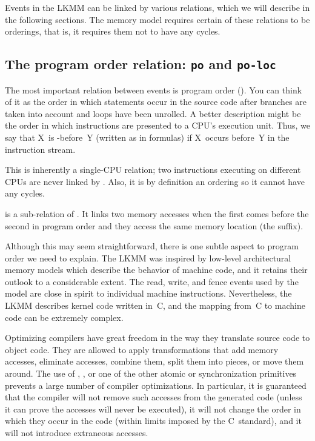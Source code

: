 Events in the LKMM can be linked by various relations, which we will
describe in the following sections.
The memory model requires certain of these relations to be orderings,
that is, it requires them not to have any cycles.


\subsection{The program order relation: \texttt{po} and \texttt{po-loc}}
\label{sec:docs:explanation:The Program Order Relation: po and po-loc}

The most important relation between events is program order ().
You can think of it as the order in which statements occur in the source
code after branches are taken into account and loops have been
unrolled.
A better description might be the order in which instructions are
presented to a CPU's execution unit.
Thus, we say that X~is -before~Y (written as  in
formulas) if X~occurs before~Y in the instruction stream.

This is inherently a single-CPU relation; two instructions executing
on different CPUs are never linked by .
Also, it is by definition an ordering so it cannot have any cycles.

 is a sub-relation of .
It links two memory accesses when the first comes before the second
in program order and they access the same memory location (the 
suffix).

Although this may seem straightforward, there is one subtle aspect to
program order we need to explain.
The LKMM was inspired by low-level architectural memory models which
describe the behavior of machine code, and it retains their outlook
to a considerable extent.
The read, write, and fence events used by the model are close in spirit
to individual machine instructions.
Nevertheless, the LKMM describes kernel code written in~C, and the
mapping from~C to machine code can be extremely complex.

Optimizing compilers have great freedom in the way they translate
source code to object code.
They are allowed to apply transformations that add memory accesses,
eliminate accesses, combine them, split them into pieces, or move them
around.
The use of , , or one of the other
atomic or synchronization primitives prevents a large number of
compiler optimizations.
In particular, it is guaranteed that the compiler will not remove such
accesses from the generated code (unless it can prove the accesses will
never be executed), it will not change the order in which they occur
in the code (within limits imposed by the C~standard), and it will not
introduce extraneous accesses.

